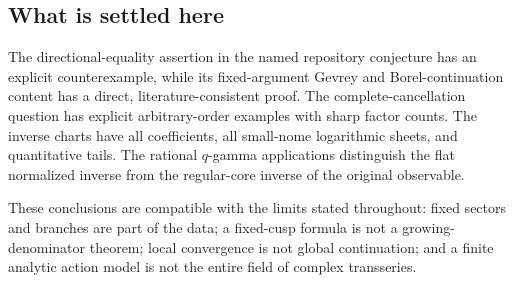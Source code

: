 \subsection{What is settled here}

The directional-equality assertion in the named repository
conjecture has an explicit counterexample, while its
fixed-argument Gevrey and Borel-continuation content has a
direct, literature-consistent proof.
The complete-cancellation question has explicit arbitrary-order
examples with sharp factor counts.
The inverse charts have all coefficients, all small-nome
logarithmic sheets, and quantitative tails.
The rational \(q\)-gamma applications distinguish the flat
normalized inverse from the regular-core inverse of the original
observable.

These conclusions are compatible with the limits stated
throughout: fixed sectors and branches are part of the data;
a fixed-cusp formula is not a growing-denominator theorem;
local convergence is not global continuation; and a finite
analytic action model is not the entire field of complex
transseries.
